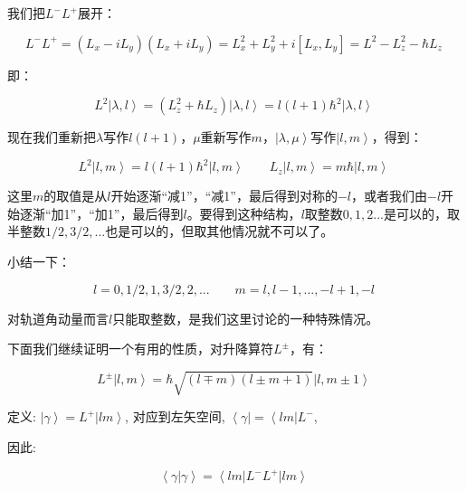 我们把$L^- L^+$展开：

\begin{equation}
L^- L^+ = ( L_x - i L_y ) (L_x + i L_y) = L_x^2 + L_y^2 + i [ L_x, L_y ] 
{} = L^2 - L_z^2 - \hbar L_z~
\end{equation}

即：

\begin{equation}
L^2 \left| \lambda, l \right\rangle = (L_z^2 + \hbar L_z) \left| \lambda, l \right\rangle = l (l + 1)\hbar^2 \left| \lambda, l \right\rangle~
\end{equation}

现在我们重新把$\lambda$写作$l (l +1)$，$\mu$重新写作$m$，$\left|  \lambda, \mu \right\rangle$写作$\left| l, m \right\rangle$，得到：

\begin{equation}
L^2 \left| l,m \right\rangle = l(l+1)\hbar^2 \left| l,m \right\rangle \qquad
L_z \left| l,m \right\rangle = m \hbar \left| l,m \right\rangle~
\end{equation}

这里$m$的取值是从$l$开始逐渐“减1”，“减1”，最后得到对称的$-l$，或者我们由$-l$开始逐渐“加1”，“加1”，最后得到$l$。要得到这种结构，$l$取整数$0, 1, 2 ...$是可以的，取半整数$1/2, 3/2, ...$也是可以的，但取其他情况就不可以了。

小结一下：

\begin{equation}
l = 0, 1/2, 1, 3/2, 2, ... \qquad
m = l, l-1, ..., -l +1 , -l~
\end{equation}

对轨道角动量而言$l$只能取整数，是我们这里讨论的一种特殊情况。

下面我们继续证明一个有用的性质，对升降算符$L^{\pm}$，有：

\begin{equation}
L^{\pm} \left| l,m \right\rangle = \hbar \sqrt{(l \mp m)(l \pm m +1)
} \left|l, m \pm 1 \right\rangle~
\end{equation}

定义: $\left| \gamma \right\rangle = L^+ \left| lm
\right\rangle$, 对应到左矢空间, $\left\langle \gamma \right| =
\left\langle lm  \right| L^-$,

因此:

\begin{equation}
\left\langle \gamma | \gamma \right\rangle = \left\langle lm \right|
L^- L^+ \left| lm \right\rangle~
\end{equation}

